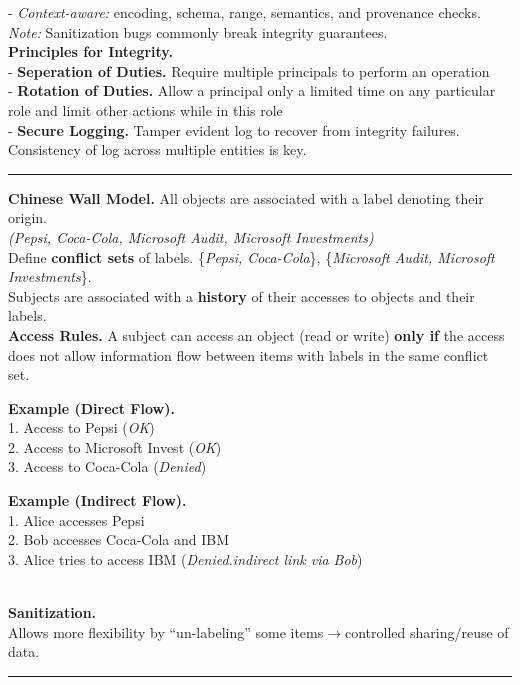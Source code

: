 \documentclass[9pt, a4paper]{extarticle}
\makeatletter
\renewcommand{\hline}{\noalign{\vskip 2px}\hrule\@height\arrayrulewidth\@width\linewidth\noalign{\vskip 2px}}
\makeatother
\begin{document}
\begin{minipage}[t]{0.495\textwidth}
	- \textit{Context-aware:} encoding, schema, range, semantics, and provenance checks.\\
	\textit{Note:} Sanitization bugs commonly break integrity guarantees.\\
	\textbf{Principles for Integrity.}\\
	- \textbf{Seperation of Duties.} Require multiple principals to perform an operation\\
	- \textbf{Rotation of Duties.} Allow a principal only a limited time on any particular role and limit other actions while in this role\\
	- \textbf{Secure Logging.} Tamper evident log to recover from integrity failures. Consistency of log across multiple entities is key.
	\hline
	\textbf{Chinese Wall Model.} All objects are associated with a label denoting their origin.\\
	\textit{(Pepsi, Coca-Cola, Microsoft Audit, Microsoft Investments)}\\
	Define \textbf{conflict sets} of labels.
	\{\textit{Pepsi, Coca-Cola}\}, \{\textit{Microsoft Audit, Microsoft Investments}\}.\\
	Subjects are associated with a \textbf{history} of their accesses to objects and their labels.\\
	\textbf{Access Rules.} A subject can access an object (read or write) \textbf{only if} the access does not allow information flow between items with labels in the same conflict set.\\
	\begin{minipage}[t]{0.38\textwidth}
		\textbf{Example (Direct Flow).}\\
		1. Access to Pepsi (\textit{OK})\\
		2. Access to Microsoft Invest (\textit{OK})\\
		3. Access to Coca-Cola (\textit{Denied})
	\end{minipage}
	\begin{minipage}[t]{0.63\textwidth}
		\textbf{Example (Indirect Flow).}\\
		1. Alice accesses Pepsi\\
		2. Bob accesses Coca-Cola and IBM\\
		3. Alice tries to access IBM (\textit{Denied.indirect link via Bob})
	\end{minipage}\\[2px]
	\textbf{Sanitization.}\\
	Allows more flexibility by “un-labeling” some items$\to$controlled sharing/reuse of data.
	\hline

\end{minipage}
\end{document}
